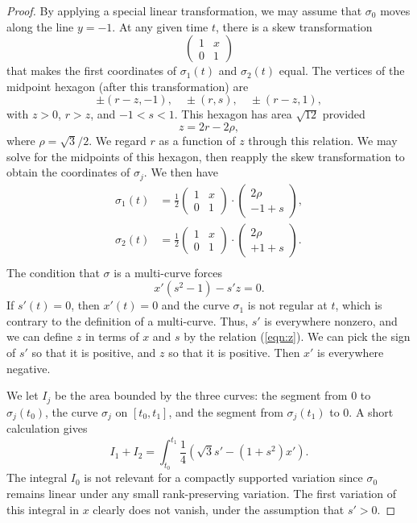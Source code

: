\documentclass[11pt]{amsart}
\begin{document}
\begin{proof}  By applying a special linear transformation, we may assume that $\sigma_0$ moves along the line $y=-1$.  At any given time $t$, there is a skew transformation
\def\xm{\left(\begin{matrix} 1& x\\0&1\end{matrix}\right)}
\def\vc#1#2{\left(\begin{matrix}#1\\#2\end{matrix}\right)}
$$
\xm
$$
that makes the first coordinates of  $\sigma_1(t)$ and $\sigma_2(t)$ equal.   The vertices of the midpoint hexagon (after this transformation) are
$$
\pm (r-z,-1), \quad \pm (r,s),\quad \pm (r-z,1),
$$
with $z>0$, $r>z$, and $-1<s<1$.  This hexagon has area $\sqrt{12}$ provided
$$
z = 2 r - 2 \rho,
$$
where  $\rho = \sqrt3/2$.  We regard $r$ as a function of $z$ through this relation.
We may solve for the midpoints of this hexagon, then reapply the skew transformation to obtain the coordinates of $\sigma_j$.
We then have
$$
\begin{array}{lll}
\sigma_1(t) &= \frac12\xm\cdot\vc {2\rho}{-1+s},\\
\sigma_2(t) &= \frac12\xm\cdot\vc {2\rho}{+1+s}.\\
\end{array}
$$
The condition that $\sigma$ is a multi-curve forces
\begin{equation}\label{eqn:z}
x' (s^2 - 1) - s' z = 0.
\end{equation}
If $s'(t)=0$, then $x'(t)=0$ and the curve $\sigma_1$ is not regular at $t$, which is contrary to the definition of a multi-curve.  Thus, $s'$ is everywhere nonzero, and we can define $z$ in terms of $x$ and $s$ by the relation (\ref{eqn:z}).  We can pick the sign of $s'$ so that it is positive, and $z$ so that it is positive.  Then $x'$ is everywhere negative.

We let $I_j$ be the area bounded by the three curves: the segment from $0$ to $\sigma_j(t_0)$, the curve $\sigma_j$ on $[t_0,t_1]$, and the segment from $\sigma_j(t_1)$ to $0$.  A short calculation gives
$$
I_1 + I_2 = \int_{t_0}^{t_1} \frac{1}4 (\sqrt{3} s' - (1+s^2) x').
$$
The integral $I_0$ is not relevant for a compactly supported variation
since $\sigma_0$ remains linear under any small rank-preserving variation.  The first variation of this integral in $x$ clearly does not vanish,
under the assumption that $s'>0$.
\end{proof}
\end{document}
